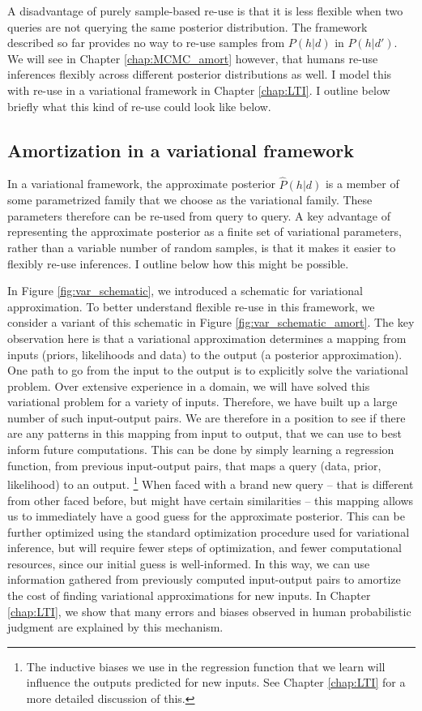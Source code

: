 A disadvantage of purely sample-based re-use is that it is less flexible when two queries are not querying the same posterior distribution. The framework described so far provides no way to re-use samples from $P(h | d)$ in $P(h | d')$. We will see in Chapter \ref{chap:MCMC_amort} however, that humans re-use inferences flexibly across different posterior distributions as well. I model this with re-use in a variational framework in Chapter \ref{chap:LTI}. I outline below briefly what this kind of re-use could look like below.

\subsection*{Amortization in a variational framework} 

In a variational framework, the approximate posterior $\hat{P}(h | d)$ is a member of some parametrized family that we choose as the variational family. These parameters therefore can be re-used from query to query. A key advantage of representing the approximate posterior as a finite set of variational parameters, rather than a variable number of random samples, is that it makes it easier to flexibly re-use inferences. I outline below how this might be possible.

In Figure \ref{fig:var_schematic}, we introduced a schematic for variational approximation. To better understand flexible re-use in this framework, we consider a variant of this schematic in Figure \ref{fig:var_schematic_amort}. The key observation here is that a variational approximation determines a mapping from inputs (priors, likelihoods and data) to the output (a posterior approximation). One path to go from the input to the output is to explicitly solve the variational problem. Over extensive experience in a domain, we will have solved this variational problem for a variety of inputs. Therefore, we have built up a large number of such input-output pairs. We are therefore in a position to see if there are any patterns in this mapping from input to output, that we can use to best inform future computations. This can be done by simply learning a regression function, from previous input-output pairs, that maps a query (data, prior, likelihood) to an output. \footnote{The inductive biases we use in the regression function that we learn will influence the outputs predicted for new inputs. See Chapter \ref{chap:LTI} for a more detailed discussion of this.} When faced with a brand new query -- that is different from other faced before, but might have certain similarities -- this mapping allows us to immediately have a good guess for the approximate posterior. This can be further optimized using the standard optimization procedure used for variational inference, but will require fewer steps of optimization, and fewer computational resources, since our initial guess is well-informed. In this way, we can use information gathered from previously computed input-output pairs to amortize the cost of finding variational approximations for new inputs. In Chapter \ref{chap:LTI}, we show that many errors and biases observed in human probabilistic judgment are explained by this mechanism.

